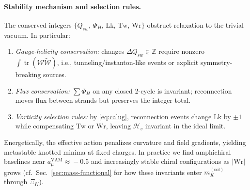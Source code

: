 \paragraph{Stability mechanism and selection rules.}
The conserved integers \(\{Q_{\!sw},\,\Phi_H,\,\mathrm{Lk},\,\mathrm{Tw},\,\mathrm{Wr}\}\) obstruct relaxation to the trivial vacuum. In particular:
\begin{enumerate}
    \item \textit{Gauge-helicity conservation:} changes \(\Delta Q_{\!sw}\in\mathbb{Z}\) require nonzero \(\int \mathop{\mathrm{tr}}(\mathcal{W}\tilde{\mathcal{W}})\), i.e., tunneling/instanton-like events or explicit symmetry-breaking sources.
    \item \textit{Flux conservation:} \(\sum \Phi_H\) on any closed 2-cycle is invariant; reconnection moves flux between strands but preserves the integer total.
    \item \textit{Vorticity selection rules:} by \eqref{eq:calug}, reconnection events change \(\mathrm{Lk}\) by \(\pm1\) while compensating \(\mathrm{Tw}\) or \(\mathrm{Wr}\), leaving \(\mathcal{H}_{\!v}\) invariant in the ideal limit.
\end{enumerate}
Energetically, the effective action penalizes curvature and field gradients, yielding metastable knotted minima at fixed charges. In practice we find amphichiral baselines near \(a_\mu^{\mathrm{VAM}}\!\approx\!-0.5\) and increasingly stable chiral configurations as \(|\mathrm{Wr}|\) grows (cf.\ Sec.~\ref{sec:mass-functional} for how these invariants enter \(m_K^{(\mathrm{sol})}\) through \(\Xi_K\)).
